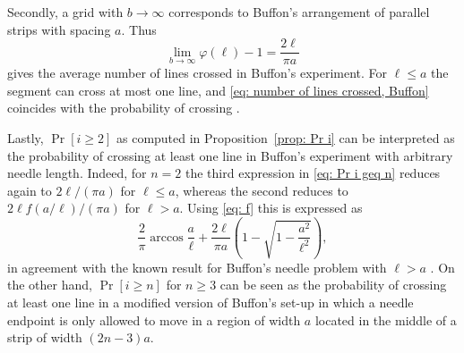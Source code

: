 \documentclass[12pt, a4paper]{article}
\newcommand{\funta}{\varphi} %
\newcommand{\len}{\ell} %
\begin{document}
Secondly, a grid with $b \rightarrow \infty$ corresponds to Buffon's arrangement of parallel strips with spacing $a$. Thus
\begin{equation}
\label{eq: number of lines crossed, Buffon}
\lim_{b \rightarrow \infty} \funta(\len)-1 = \frac{2\len}{\pi a}
\end{equation}
gives the average number of lines crossed in Buffon's experiment. For $\len \leq a$ the segment can cross at most one line, and \eqref{eq: number of lines crossed, Buffon} coincides with the probability of crossing \cite[theorem 1.1.1]{Mathai99}.

Lastly, $\Pr[i \geq 2]$ as computed in Proposition~\ref{prop: Pr i} can be interpreted as the probability of crossing at least one line in Buffon's experiment with arbitrary needle length. Indeed, for $n=2$ the third expression in \eqref{eq: Pr i geq n} reduces again to $2\len/(\pi a)$ for $\len \leq a$, whereas the second reduces to $2\len f(a/\len)/(\pi a)$ for $\len > a$. Using \eqref{eq: f} this is expressed as
\[
\frac 2 \pi \arccos\frac a \len + \frac{2\len}{\pi a} \left(1 - \sqrt{1-\frac{a^2}{\len^2}} \right),
\]
in agreement with the known result for Buffon's needle problem with $\len > a$ \cite[theorem 1.1.2]{Mathai99}. On the other hand, $\Pr[i \geq n]$ for $n \geq 3$ can be seen as the probability of crossing at least one line in a modified version of Buffon's set-up in which a needle endpoint is only allowed to move in a region of width $a$ located in the middle of a strip of width $(2n-3)a$. 
\end{document}
